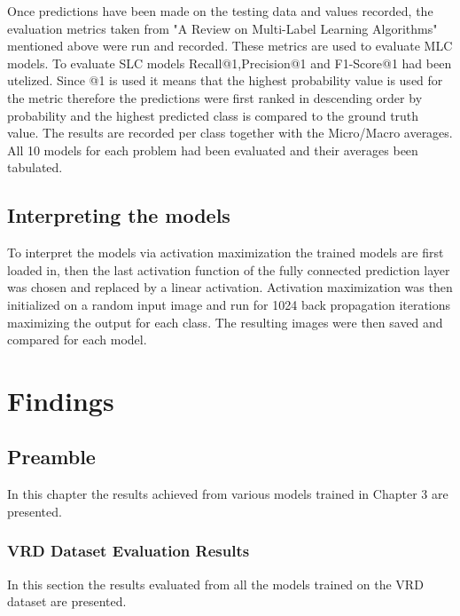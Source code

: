 \documentclass{csfyp}
\begin{document}
Once predictions have been made on the testing data and values recorded, the evaluation metrics taken from "A Review on Multi-Label Learning Algorithms" mentioned above were run and recorded. These metrics are used to evaluate MLC models. To evaluate SLC models Recall@1,Precision@1 and F1-Score@1 had been utelized. Since @1 is used it means that the highest probability value is used for the metric therefore the predictions were first ranked in descending order by probability and the highest predicted class is compared to the ground truth value. The results are recorded per class together with the Micro/Macro averages. All 10 models for each problem had been evaluated and their averages been tabulated.

\subsection{Interpreting the models}
To interpret the models via activation maximization the trained models are first loaded in, then the last activation function of the fully connected prediction layer was chosen and replaced by a linear activation. Activation maximization was then initialized on a random input image and run for 1024 back propagation iterations maximizing the output for each class. The resulting images were then saved and compared for each model.

\section{Findings}
\subsection{Preamble}
In this chapter the results achieved from various models trained in Chapter 3 are presented.

\subsubsection{VRD Dataset Evaluation Results}
In this section the results evaluated from all the models trained on the VRD dataset are presented.
\end{document}
